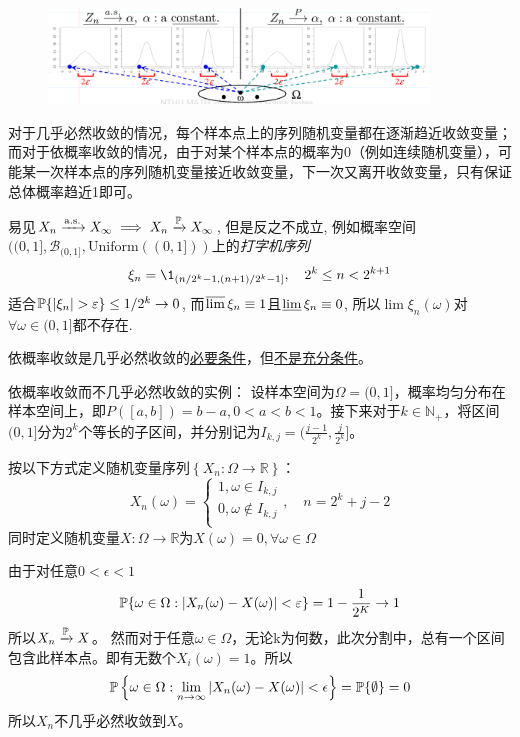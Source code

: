 \begin{figure}[h]
    \centering
    \includegraphics[width=0.9\textwidth]{image/converge1.png}
\end{figure}

\begin{remark}
    对于几乎必然收敛的情况，每个样本点上的序列随机变量都在逐渐趋近收敛变量；而对于依概率收敛的情况，由于对某个样本点的概率为0（例如连续随机变量），可能某一次样本点的序列随机变量接近收敛变量，下一次又离开收敛变量，只有保证总体概率趋近1即可。
\end{remark}

易见$X_{n} \xrightarrow{\as} X_{\infty} \implies X_{n} \xrightarrow{\P} X_{\infty}$, 但是反之不成立, 例如概率空间$((0,1],\mathscr{B}_{(0,1]},\mathrm{Uniform}((0,1]))$上的\emph{打字机序列}
\[ \xi_{n} = \1_{(n/2^{k}-1,(n+1)/2^{k}-1]}, \quad 2^{k} \le n < 2^{k+1} \]
适合$\P\{\abs{\xi_{n}}>\e\} \le 1/2^{k} \to 0$, 而$\varlimsup \xi_{n} \equiv 1$且$\varliminf \xi_{n} \equiv 0$, 所以$\lim \xi_{n}(\omega)$对$\forall \omega \in (0,1]$都不存在.

\begin{proposition}
    依概率收敛是几乎必然收敛的\underline{必要条件}，但\underline{不是充分条件}。
\end{proposition}

\begin{example}
    依概率收敛而不几乎必然收敛的实例：
    设样本空间为$\Omega = (0,1]$，概率均匀分布在样本空间上，即$P([a,b])=b-a,0<a<b<1$。接下来对于$k \in \mathbb{N}_+$，将区间$(0,1]$分为$2^{k}$个等长的子区间，并分别记为$I_{k,j}=(\frac{j-1}{2^k},\frac{j}{2^k}]$。

    按以下方式定义随机变量序列$\left\{ X_n: \Omega \to \mathbb{R} \right\}$：
    \[ X_n(\omega)=\begin{cases}
            1, \omega \in I_{k,j}    \\
            0, \omega \notin I_{k,j} \\
        \end{cases} ,\quad n = 2^k+j-2\]
    同时定义随机变量$X: \Omega \to \mathbb{R}$为$X(\omega)=0,\forall \omega \in \Omega$

    由于对任意$0<\epsilon<1$ 
    \[ \P\{\omega \in \Omega: \abs{X_n(\omega) - X(\omega)}<\e\}=1-\frac{1}{2^K} \to 1  \]
    所以$X_{n} \xrightarrow{\P} X$。
    然而对于任意$\omega \in \Omega$，无论k为何数，此次分割中，总有一个区间包含此样本点。即有无数个$X_i(\omega) = 1$。所以
    \[ \P\left\{ \omega \in \Omega: \lim_{n \to \infty}\abs{ X_n(\omega) - X(\omega)} < \epsilon \right\} =\P\{\emptyset \}=0 \]
    所以$X_{n}$不几乎必然收敛到$X$。
\end{example}


